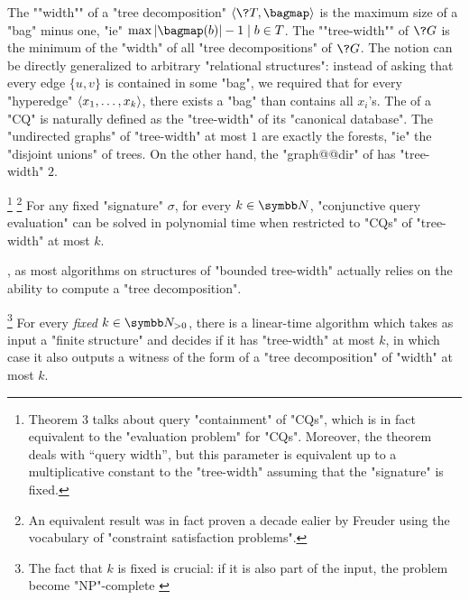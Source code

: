 The \AP""width"" of a "tree decomposition" $\tup{\?T, \bagmap}$ is the maximum size of a "bag" minus one, "ie" $\max{|\bagmap(b)|-1 \mid b\in T}$.
The \AP""tree-width"" of $\?G$ is the minimum of the "width" of all "tree decompositions" of $\?G$. 
The notion can be directly generalized to arbitrary "relational structures":
instead of asking that every edge $\{u,v\}$ is contained in some "bag",
we required that for every "hyperedge" $\langle x_1,\dotsc,x_k\rangle$,
there exists a "bag" than contains all $x_i$'s.
The  of a "CQ" is naturally defined as
the "tree-width" of its "canonical database".
The "undirected graphs" of "tree-width" at most $1$ are exactly
the forests, "ie" the "disjoint unions" of trees.
On the other hand, the "graph@@dir" of  has "tree-width" $2$.

\begin{proposition}
	\!\footnote{Theorem 3 talks about query "containment" of "CQs", which is in fact equivalent
	to the "evaluation problem" for "CQs". Moreover, the theorem deals with ``query width'',
	but this parameter is equivalent up to a multiplicative constant to the "tree-width"
	\cite[Lemma~2]{ChekuriRajaraman2000Containment} assuming that the "signature" is fixed.} 
	\footnote{An equivalent result was in fact proven a decade ealier
	by Freuder \cite[Theorem~3]{Freuder1990Complexity} using the
	vocabulary of "constraint satisfaction problems".}
	\AP\label{prop:eval-CQ-bounded-tw}
	For any fixed "signature" $\sigma$,
	for every $k\in\N$, "conjunctive query evaluation" can
	be solved in polynomial time when restricted to "CQs" of
	"tree-width" at most $k$.
\end{proposition}

, as most algorithms on structures of
"bounded tree-width" actually relies on the ability to compute
a "tree decomposition".
\begin{proposition}
	\!\footnote{The fact that $k$ is fixed is crucial: if it is also
	part of the input, the problem become "NP"-complete
	\cite[Theorem~3.3]{ArnborgCorneilProskurowski1987Complexity}}
	\label{prop:bodlaender}
	For every \emph{fixed} $k\in\Np$, there is a linear-time algorithm
	which takes as input a "finite structure" and decides
	if it has "tree-width" at most $k$, in which case it also
	outputs a witness of the form of a "tree decomposition" of "width" at most $k$. 
\end{proposition}

